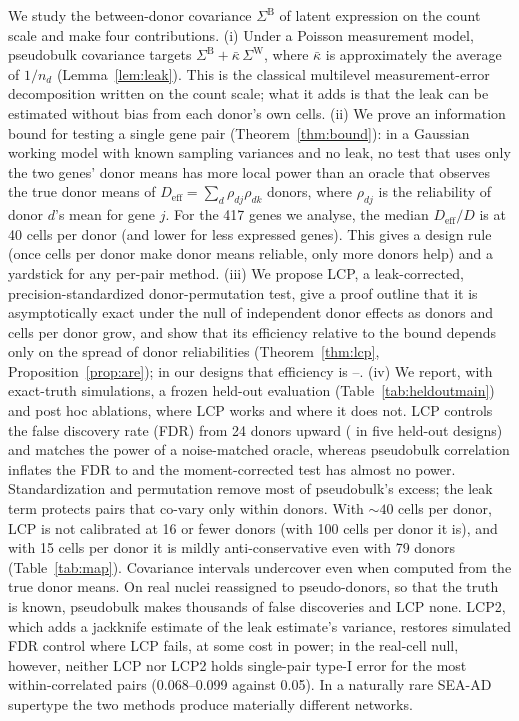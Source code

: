 \documentclass[10pt,letterpaper]{article}
\theoremstyle{definition}
\newcommand{\SB}{\Sigma^{\mathrm{B}}}
\newcommand{\SW}{\Sigma^{\mathrm{W}}}
\newcommand{\Deff}{D_{\mathrm{eff}}}
\begin{document}
We study the between-donor covariance $\SB$ of latent expression on the count scale and make four contributions.
(i) Under a Poisson measurement model, pseudobulk covariance targets $\SB+\bar\kappa\,\SW$, where $\bar\kappa$ is approximately the average of $1/n_d$ (Lemma~\ref{lem:leak}). This is the classical multilevel measurement-error decomposition \citep{Muthen1994,AkritasBershady1996} written on the count scale; what it adds is that the leak can be estimated without bias from each donor's own cells.
(ii) We prove an information bound for testing a single gene pair (Theorem~\ref{thm:bound}): in a Gaussian working model with known sampling variances and no leak, no test that uses only the two genes' donor means has more local power than an oracle that observes the true donor means of $\Deff=\sum_d\rho_{dj}\rho_{dk}$ donors, where $\rho_{dj}$ is the reliability of donor $d$'s mean for gene $j$. For the 417 genes we analyse, the median $\Deff/D$ is \DeffCapRange{} at 40 cells per donor (and lower for less expressed genes). This gives a design rule (once cells per donor make donor means reliable, only more donors help) and a yardstick for any per-pair method.
(iii) We propose LCP, a leak-corrected, precision-standardized donor-permutation test, give a proof outline that it is asymptotically exact under the null of independent donor effects as donors and cells per donor grow, and show that its efficiency relative to the bound depends only on the spread of donor reliabilities (Theorem~\ref{thm:lcp}, Proposition~\ref{prop:are}); in our designs that efficiency is \AREmin{}--\AREmax{}.
(iv) We report, with exact-truth simulations, a frozen held-out evaluation (Table~\ref{tab:heldoutmain}) and post hoc ablations, where LCP works and where it does not. LCP controls the false discovery rate (FDR) from 24 donors upward (\HOLCPFDRrange{} in five held-out designs) and matches the power of a noise-matched oracle, whereas pseudobulk correlation inflates the FDR to \PBFDRrange{} and the moment-corrected test has almost no power. Standardization and permutation remove most of pseudobulk's excess; the leak term protects pairs that co-vary only within donors. With ${\sim}40$ cells per donor, LCP is not calibrated at 16 or fewer donors (with 100 cells per donor it is), and with 15 cells per donor it is mildly anti-conservative even with 79 donors (Table~\ref{tab:map}). Covariance intervals undercover even when computed from the true donor means. On real nuclei reassigned to pseudo-donors, so that the truth is known, pseudobulk makes thousands of false discoveries and LCP none. LCP2, which adds a jackknife estimate of the leak estimate's variance, restores simulated FDR control where LCP fails, at some cost in power; in the real-cell null, however, neither LCP nor LCP2 holds single-pair type-I error for the most within-correlated pairs (0.068--0.099 against 0.05). In a naturally rare SEA-AD supertype the two methods produce materially different networks.
\end{document}
